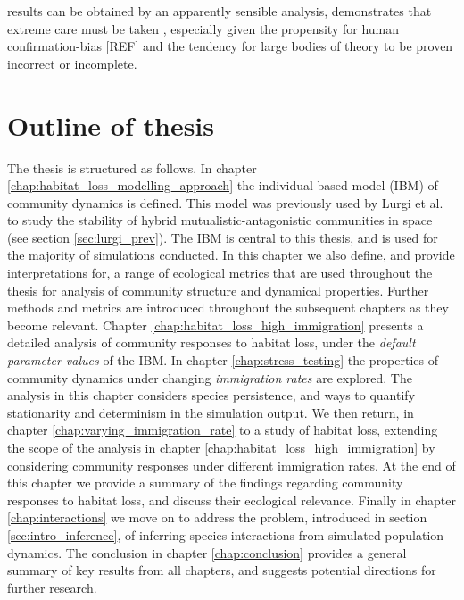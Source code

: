 results can be obtained by an apparently sensible analysis, demonstrates that extreme care must be taken , especially given the propensity for human confirmation-bias [REF] and the tendency for large bodies of theory to be proven incorrect or incomplete.     
%

\section{Outline of thesis}
\label{sec:intro_outline}

The thesis is structured as follows. In chapter \ref{chap:habitat_loss_modelling_approach} the individual based model (IBM) of community dynamics is defined. This model was previously used by Lurgi et al. \cite{lurgi2015effects} to study the stability of hybrid mutualistic-antagonistic communities in space (see section \ref{sec:lurgi_prev}). The IBM is central to this thesis, and is used for the majority of simulations conducted. In this chapter we also define, and provide interpretations for, a range of ecological metrics that are used throughout the thesis for analysis of community structure and dynamical properties. Further methods and metrics are introduced throughout the subsequent chapters as they become relevant. Chapter \ref{chap:habitat_loss_high_immigration} presents a detailed analysis of community responses to habitat loss, under the \emph{default parameter values} of the IBM. In chapter \ref{chap:stress_testing} the properties of community dynamics under changing \emph{immigration rates} are explored. The analysis in this chapter considers species persistence, and ways to quantify stationarity and determinism in the simulation output. We then return, in chapter \ref{chap:varying_immigration_rate} to a study of habitat loss, extending the scope of the analysis in chapter \ref{chap:habitat_loss_high_immigration} by considering community responses under different immigration rates. At the end of this chapter we provide a summary of the findings regarding community responses to habitat loss, and discuss their ecological relevance. Finally in chapter \ref{chap:interactions} we move on to address the problem, introduced in section \ref{sec:intro_inference}, of inferring species interactions from simulated population dynamics. The conclusion in chapter \ref{chap:conclusion} provides a general summary of key results from all chapters, and suggests potential directions for further research.

